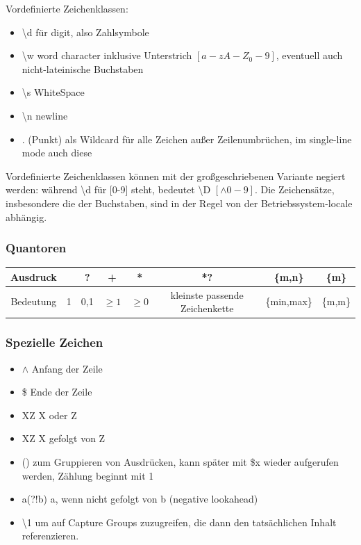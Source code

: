 \documentclass[12pt,a4]{article}
\begin{document}
 	Vordefinierte Zeichenklassen:
 	\begin{itemize}
 		\item \textbackslash d für digit, also Zahlsymbole
 		\item \textbackslash w word character inklusive Unterstrich \(\left[a-zA-Z_0-9\right]\), eventuell auch nicht-lateinische Buchstaben
 		\item \textbackslash s WhiteSpace
 		\item \textbackslash n newline
 		\item . (Punkt) als Wildcard für alle Zeichen außer Zeilenumbrüchen, im single-line mode auch diese
 	\end{itemize}
 Vordefinierte Zeichenklassen können mit der großgeschriebenen Variante negiert werden: während \textbackslash d für [0-9] steht, bedeutet \textbackslash D \(\left[\wedge 0-9\right]\).
 Die Zeichensätze, insbesondere die der Buchstaben, sind in der Regel von der Betriebssystem-locale abhängig.
	\subsubsection{Quantoren}
	
	\begin{center}
	\begin{tabular}{|c|c|c|c|c|c|c|c|}
		\hline 
		Ausdruck&  & ? & + & *&*?&\{m,n\}&\{m\}\\ 
		\hline 
		Bedeutung&  1&  0,1& \(\geq 1\) &  \(\geq 0\)&kleinste passende Zeichenkette&\{min,max\}&\{m,m\}\\ 
		\hline 
	\end{tabular} 
\end{center}

\subsubsection{Spezielle Zeichen}
\begin{itemize}
	\item \(\wedge\) Anfang der Zeile
	\item \$ Ende der Zeile
	\item X\textbar Z X oder Z
	\item XZ X gefolgt von Z
	\item () zum Gruppieren von Ausdrücken, kann später mit \$x wieder aufgerufen werden, Zählung beginnt mit 1
	\item a(?!b) a, wenn nicht gefolgt von b (negative lookahead)
	\item \textbackslash 1 um auf Capture Groups zuzugreifen, die dann den tatsächlichen Inhalt referenzieren.
\end{itemize}
\end{document}

